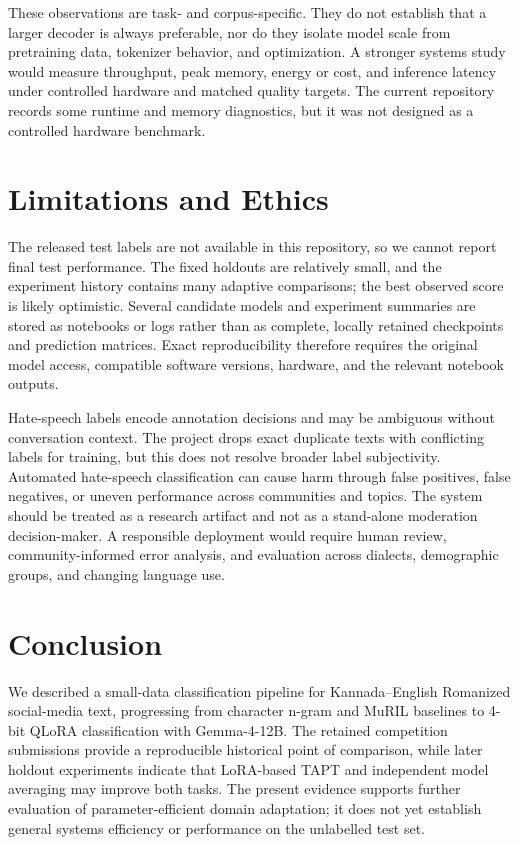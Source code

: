 \documentclass[10pt]{article}
\begin{document}
These observations are task- and corpus-specific. They do not establish that a
larger decoder is always preferable, nor do they isolate model scale from
pretraining data, tokenizer behavior, and optimization. A stronger systems
study would measure throughput, peak memory, energy or cost, and inference
latency under controlled hardware and matched quality targets. The current
repository records some runtime and memory diagnostics, but it was not designed
as a controlled hardware benchmark.

\section{Limitations and Ethics}
The released test labels are not available in this repository, so we cannot
report final test performance. The fixed holdouts are relatively small, and the
experiment history contains many adaptive comparisons; the best observed score
is likely optimistic. Several candidate models and experiment summaries are
stored as notebooks or logs rather than as complete, locally retained
checkpoints and prediction matrices. Exact reproducibility therefore requires
the original model access, compatible software versions, hardware, and the
relevant notebook outputs.

Hate-speech labels encode annotation decisions and may be ambiguous without
conversation context. The project drops exact duplicate texts with conflicting
labels for training, but this does not resolve broader label subjectivity.
Automated hate-speech classification can cause harm through false positives,
false negatives, or uneven performance across communities and topics. The
system should be treated as a research artifact and not as a stand-alone
moderation decision-maker. A responsible deployment would require human review,
community-informed error analysis, and evaluation across dialects, demographic
groups, and changing language use.

\section{Conclusion}
We described a small-data classification pipeline for Kannada--English
Romanized social-media text, progressing from character n-gram and MuRIL
baselines to 4-bit QLoRA classification with Gemma-4-12B. The retained
competition submissions provide a reproducible historical point of comparison,
while later holdout experiments indicate that LoRA-based TAPT and independent
model averaging may improve both tasks. The present evidence supports further
evaluation of parameter-efficient domain adaptation; it does not yet establish
general systems efficiency or performance on the unlabelled test set.
\end{document}
